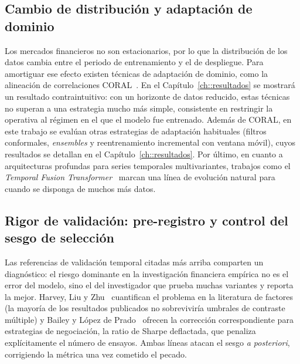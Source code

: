 \subsection{Cambio de distribución y adaptación de dominio}

Los mercados financieros no son estacionarios, por lo que la distribución de los datos
cambia entre el periodo de entrenamiento y el de despliegue. Para amortiguar ese efecto
existen técnicas de adaptación de dominio, como la alineación de correlaciones
CORAL~\cite{sun2016coral}. En el Capítulo~\ref{ch::resultados} se mostrará un resultado
contraintuitivo: con un horizonte de datos reducido, estas técnicas no superan a una
estrategia mucho más simple, consistente en restringir la operativa al régimen en el que
el modelo fue entrenado. Además de CORAL, en este trabajo se evalúan otras estrategias de
adaptación habituales (filtros conformales, \emph{ensembles} y reentrenamiento incremental
con ventana móvil), cuyos resultados se detallan en el Capítulo~\ref{ch::resultados}. Por
último, en cuanto a arquitecturas profundas para series temporales multivariantes, trabajos
como el \emph{Temporal Fusion Transformer}~\cite{lim2021tft} marcan una línea de evolución
natural para cuando se disponga de muchos más datos.

\subsection{Rigor de validación: pre-registro y control del sesgo de selección}

Las referencias de validación temporal citadas más arriba comparten un diagnóstico: el
riesgo dominante en la investigación financiera empírica no es el error del modelo,
sino el del investigador que prueba muchas variantes y reporta la mejor. Harvey, Liu y
Zhu~\cite{harvey2016cross} cuantifican el problema en la literatura de factores (la
mayoría de los resultados publicados no sobreviviría umbrales de contraste múltiple) y
Bailey y López de Prado~\cite{bailey2014deflated} ofrecen la corrección
correspondiente para estrategias de negociación, la ratio de Sharpe deflactada, que
penaliza explícitamente el número de ensayos. Ambas líneas atacan el sesgo
\emph{a posteriori}, corrigiendo la métrica una vez cometido el pecado.

